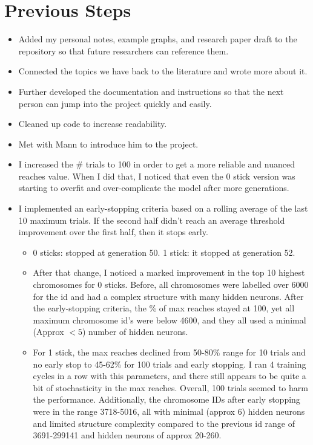\documentclass{article}
\begin{document}
\section{Previous Steps}
\begin{itemize}
    \item Added my personal notes, example graphs, and research paper draft to the repository so that future researchers can reference them.
    \item Connected the topics we have back to the literature and wrote more about it.
    \item Further developed the documentation and instructions so that the next person can jump into the project quickly and easily.
    \item Cleaned up code to increase readability.
    \item Met with Mann to introduce him to the project.
    \item I increased the \# trials to 100 in order to get a more reliable and nuanced reaches value. When I did that, I noticed that even the 0 stick version was starting to overfit and over-complicate the model after more generations.
    \item I implemented an early-stopping criteria based on a rolling average of the last 10 maximum trials. If the second half didn't reach an average threshold improvement over the first half, then it stops early.
    \begin{itemize}
        \item 0 sticks: stopped at generation 50. 1 stick: it stopped at generation 52.
        \item After that change, I noticed a marked improvement in the top 10 highest chromosomes for 0 sticks. Before, all chromosomes were labelled over 6000 for the id and had a complex structure with many hidden neurons. After the early-stopping criteria, the \% of max reaches stayed at 100, yet all maximum chromosome id's were below 4600, and they all used a minimal (Approx $< 5$) number of hidden neurons.
        \item For 1 stick, the max reaches declined from 50-80\% range for 10 trials and no early stop to 45-62\% for 100 trials and early stopping. I ran 4 training cycles in a row with this parameters, and there still appears to be quite a bit of stochasticity in the max reaches. Overall, 100 trials seemed to harm the performance. Additionally, the chromosome IDs after early stopping were in the range 3718-5016, all with minimal (approx 6) hidden neurons and limited structure complexity compared to the previous id range of 3691-299141 and hidden neurons of approx 20-260.

\end{itemize}
\end{itemize}
\end{document}
